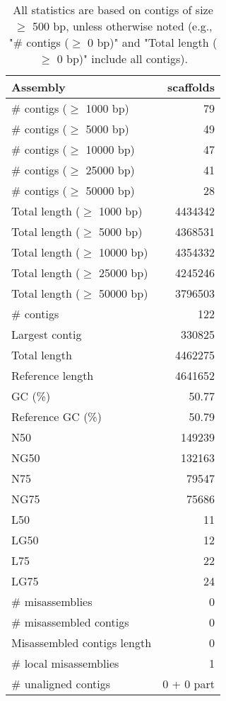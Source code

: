 \documentclass[12pt,a4paper]{article}
\begin{document}
\begin{table}[ht]
\begin{center}
\caption{All statistics are based on contigs of size $\geq$ 500 bp, unless otherwise noted (e.g., "\# contigs ($\geq$ 0 bp)" and "Total length ($\geq$ 0 bp)" include all contigs).}
\begin{tabular}{|l*{1}{|r}|}
\hline
Assembly & scaffolds \\ \hline
\# contigs ($\geq$ 1000 bp) & 79 \\ \hline
\# contigs ($\geq$ 5000 bp) & 49 \\ \hline
\# contigs ($\geq$ 10000 bp) & 47 \\ \hline
\# contigs ($\geq$ 25000 bp) & 41 \\ \hline
\# contigs ($\geq$ 50000 bp) & 28 \\ \hline
Total length ($\geq$ 1000 bp) & 4434342 \\ \hline
Total length ($\geq$ 5000 bp) & 4368531 \\ \hline
Total length ($\geq$ 10000 bp) & 4354332 \\ \hline
Total length ($\geq$ 25000 bp) & 4245246 \\ \hline
Total length ($\geq$ 50000 bp) & 3796503 \\ \hline
\# contigs & 122 \\ \hline
Largest contig & 330825 \\ \hline
Total length & 4462275 \\ \hline
Reference length & 4641652 \\ \hline
GC (\%) & 50.77 \\ \hline
Reference GC (\%) & 50.79 \\ \hline
N50 & 149239 \\ \hline
NG50 & 132163 \\ \hline
N75 & 79547 \\ \hline
NG75 & 75686 \\ \hline
L50 & 11 \\ \hline
LG50 & 12 \\ \hline
L75 & 22 \\ \hline
LG75 & 24 \\ \hline
\# misassemblies & 0 \\ \hline
\# misassembled contigs & 0 \\ \hline
Misassembled contigs length & 0 \\ \hline
\# local misassemblies & 1 \\ \hline
\# unaligned contigs & 0 + 0 part \\ \hline

\end{tabular}
\end{center}
\end{table}
\end{document}

